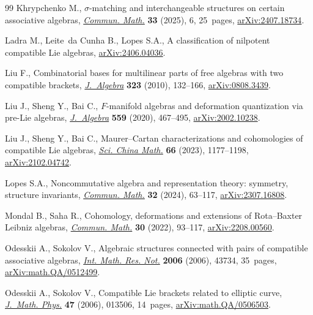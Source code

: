 \documentclass[pdftex]{sigma}
\numberwithin{equation}{section}
\begin{document}
\begin{thebibliography}{99}
Khrypchenko M., $\sigma$-matching and interchangeable structures on certain
 associative algebras,
\href{https://doi.org/10.46298/cm.13990}{\textit{Commun. Math.}} \textbf{33} (2025), 6, 25~pages,
 \href{https://arxiv.org/abs/2407.18734}{arXiv:2407.18734}.

Ladra M., Leite~da Cunha B., Lopes S.A., A classification of nilpotent
 compatible Lie algebras, \href{https://arxiv.org/abs/2406.04036}{arXiv:2406.04036}.

Liu F., Combinatorial bases for multilinear parts of free algebras with two
 compatible brackets, \href{https://doi.org/10.1016/j.jalgebra.2009.10.002}{\textit{J.~Algebra}} \textbf{323} (2010), 132--166,
 \href{https://arxiv.org/abs/0808.3439}{arXiv:0808.3439}.

Liu J., Sheng Y., Bai C., {$F$}-manifold algebras and deformation quantization
 via pre-{L}ie algebras, \href{https://doi.org/10.1016/j.jalgebra.2020.04.029}{\textit{J.~Algebra}} \textbf{559} (2020), 467--495,
 \href{https://arxiv.org/abs/2002.10238}{arXiv:2002.10238}.

Liu J., Sheng Y., Bai C., Maurer--{C}artan characterizations and cohomologies
 of compatible {L}ie algebras, \href{https://doi.org/10.1007/s11425-021-2014-5}{\textit{Sci. China Math.}} \textbf{66} (2023),
 1177--1198, \href{https://arxiv.org/abs/2102.04742}{arXiv:2102.04742}.

Lopes S.A., Noncommutative algebra and representation theory: symmetry,
 structure invariants, \href{https://doi.org/10.46298/cm.11678}{\textit{Commun. Math.}} \textbf{32} (2024), 63--117,
 \href{https://arxiv.org/abs/2307.16808}{arXiv:2307.16808}.

Mondal B., Saha R., Cohomology, deformations and extensions of {R}ota--{B}axter
 {L}eibniz algebras, \href{https://doi.org/10.46298/cm.10295}{\textit{Commun. Math.}} \textbf{30} (2022), 93--117,
 \href{https://arxiv.org/abs/2208.00560}{arXiv:2208.00560}.

Odesskii A., Sokolov V., Algebraic structures connected with pairs of
 compatible associative algebras, \href{https://doi.org/10.1155/IMRN/2006/43734}{\textit{Int. Math. Res. Not.}} \textbf{2006}
 (2006), 43734, 35~pages, \href{https://arxiv.org/abs/math.QA/0512499}{arXiv:math.QA/0512499}.

Odesskii A., Sokolov V., Compatible {L}ie brackets related to elliptic curve,
 \href{https://doi.org/10.1063/1.2158434}{\textit{J.~Math. Phys.}} \textbf{47} (2006), 013506, 14~pages,
 \href{https://arxiv.org/abs/math.QA/0506503}{arXiv:math.QA/0506503}.


\end{thebibliography}
\end{document}
